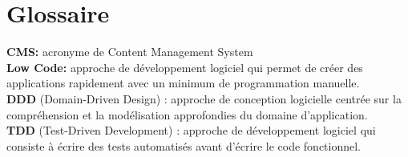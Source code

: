 \chapter{Glossaire}
\label{chap:Glossary}
\bf \normalfont

\hspace{\parindent}\textbf{CMS:} acronyme de Content Management System\\

\textbf{Low Code:} approche de développement logiciel qui permet de créer des applications rapidement avec un minimum de programmation manuelle.\\

\textbf{DDD} (Domain-Driven Design) : approche de conception logicielle centrée sur la compréhension et la modélisation approfondies du domaine d'application.\\

\textbf{TDD } (Test-Driven Development) : approche de développement logiciel qui consiste à écrire des tests automatisés avant d'écrire le code fonctionnel.\\
\pagebreak